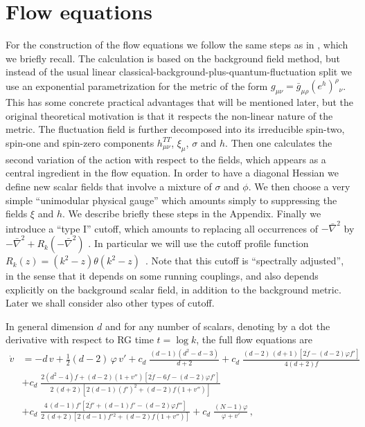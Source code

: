 \documentclass[11pt]{book} %
\newcommand{\bnabla}{\bar\nabla}
\numberwithin{equation}{chapter}
\begin{document}
\section{Flow equations}

For the construction of the flow equations we follow the same steps
as in \cite{Percacci:2015wwa}, which we briefly recall.
The calculation is based on the background field method,
but instead of the usual linear classical-background-plus-quantum-fluctuation split we
use an exponential parametrization
for the metric of the form
$g_{\mu\nu}=\bar g_{\mu\rho}(e^h)^\rho{}_\nu$.
This has some concrete practical advantages that will be
mentioned later,
but the original theoretical motivation is that it
respects the non-linear nature of the metric.
The fluctuation field is further decomposed into its irreducible
spin-two, spin-one and spin-zero components $h_{\mu\nu}^{TT}$,
$\xi_\mu$, $\sigma$ and $h$.
Then one calculates the second variation of the action with
respect to the fields, which appears as a central ingredient
in the flow equation.
In order to have a diagonal Hessian we define new scalar fields
that involve a mixture of $\sigma$ and $\phi$.
We then choose a very simple ``unimodular physical gauge''
which amounts simply to suppressing the fields $\xi$ and $h$.
We describe briefly these steps in the Appendix.
Finally we introduce a ``type I'' cutoff, which amounts to replacing
all occurrences of $-\bnabla^2$ by $-\bnabla^2+R_k(-\bnabla^2)$
\cite{Codello:2008vh}.
In particular we will use the cutoff profile function
$R_k(z)=\left(k^2-z\right)\theta\left(k^2-z\right)$~\cite{Litim:2001up}.
Note that this cutoff is ``spectrally adjusted'',
in the sense that it depends on some running couplings,
and also depends explicitly on the background scalar field,
in addition to the background metric.
Later we shall consider also other types of cutoff.

In general dimension $d$ and for any number of scalars,
denoting by a dot the derivative with respect to RG time $t=\log k$,
the full flow equations are
\begin{align}
  \dot v &= - d \, v + \frac{1}{2} (d-2) \, \varphi \, v'
    + c_d \; \frac{(d-1) \left( d^2 - d - 3 \right)} {d+2}
    + c_d \; \frac{ (d-2) \, (d+1) \left[ 2 \dot f - (d-2) \varphi f' \right] }{4 \left( d+2 \right) f} \nonumber \\[3mm]
  & + c_d \; \frac{ 2 \left( d^2 - 4 \right) f + (d - 2) \left( 1 + v'' \right) \left[ 2 \dot f - 6 f - (d - 2) \varphi f' \right] }
                  { 2 \, (d+2) \left[ 2 (d-1) \left( f' \right)^2 + (d-2) f \left( 1 + v'' \right) \right] } \nonumber \\[3mm]
  & + c_d \; \frac{ 4 \, (d - 1) f' \left[ 2 \dot f' + (d - 1) f' - (d - 2) \varphi f'' \right] }
                  { 2 \, (d+2) \left[ 2 (d-1) f'{}^2 + (d-2) f \left( 1 + v'' \right) \right] }
    + c_d \; \frac{(N-1)\varphi}{\varphi+v'} \,,
  \label{flowvfull}
\end{align}
\end{document}

